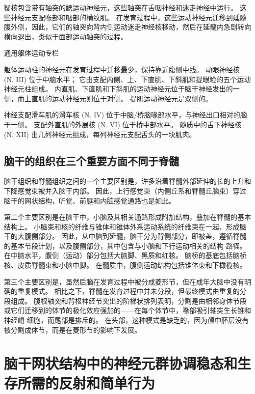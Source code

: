 疑核包含带有轴突的鳃运动神经元，这些轴突在舌咽神经和迷走神经中运行。
这些神经元支配喉部和咽部的横纹肌。
在发育过程中，这些运动神经元迁移到延髓腹外侧，因此，它们的轴突向背内侧运动迷走神经核移动，然后在延髓内急剧转向横向退出，类似于面部运动轴突的过程。


通用躯体运动专栏

躯体运动柱的神经元在发育过程中迁移最少，保持靠近腹侧中线。
动眼神经核 (N. III) 位于中脑水平；
它由支配内侧、上、下直肌、下斜肌和提眼睑的五个运动神经元柱组成。
内直肌、下直肌和下斜肌的运动神经元位于脑干神经发出的一侧，而上直肌的运动神经元则位于对侧。
提肌运动神经元是双侧的。


神经支配滑车肌的滑车核 (N. IV) 位于中脑/桥脑喙部水平，与神经出口相对的脑干一侧。
支配外直肌的外展核 (N. VI) 位于桥中部水平。
髓质中的舌下神经核 (N. XII) 由几列神经元组成，每列神经元支配舌头的一块肌肉。



\subsection{脑干的组织在三个重要方面不同于脊髓}

脑干组织和脊髓组织之间的一个主要区别是，许多沿着脊髓外部延伸的长的上升和下降感觉束被并入脑干内部。
因此，上行感觉束（内侧丘系和脊髓丘脑束）穿过脑干的网状结构，听觉、前庭和内脏感觉通路也是如此。


第二个主要区别是在脑干中，小脑及其相关通路形成附加结构，叠加在脊髓的基本结构上。
小脑束和核的纤维与锥体和锥体外系运动系统的纤维束在一起，形成脑干的大腹侧部分。
因此，从中脑到延髓，脑干分为背侧部分，即被盖，遵循脊髓的基本节段计划，以及腹侧部分，其中包含与小脑和下行运动相关的结构 路径。
在中脑水平，腹侧（运动）部分包括大脑脚、黑质和红核。
脑桥的基底包括脑桥核、皮质脊髓束和小脑中脚。
在髓质中，腹侧运动结构包括锥体束和下橄榄核。


第三个主要区别是，虽然后脑在发育过程中被分成菱形节，但在成年大脑中没有明确的重复模式。
相比之下，脊髓在发育过程中并未分段，但最终模式由重复的分段组成。
腹根轴突和背根神经节突出的阶梯状排列表明，分割是由相邻身体节段或它们迁移到的体节的极化效应强加的——在每个体节中，喙部吸引轴突生长锥和神经嵴 细胞，而尾部是排斥的。
在头部，这种模式是缺乏的，因为颅中胚层没有被分割成体节，而是在菱形节的影响下发展。



\section{脑干网状结构中的神经元群协调稳态和生存所需的反射和简单行为}

